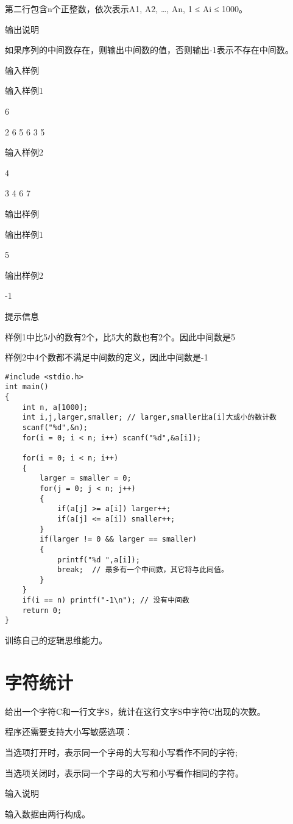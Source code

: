第二行包含n个正整数，依次表示A1, A2, \dots, An, 1 ≤ Ai ≤ 1000。 

输出说明

如果序列的中间数存在，则输出中间数的值，否则输出-1表示不存在中间数。

输入样例

输入样例1 

6 

2 6 5 6 3 5 

输入样例2 

4 

3 4 6 7 

输出样例

输出样例1 

5 

输出样例2 

-1

提示信息

样例1中比5小的数有2个，比5大的数也有2个。因此中间数是5 

样例2中4个数都不满足中间数的定义，因此中间数是-1

\begin{lstlisting}
#include <stdio.h>
int main()
{
	int n, a[1000];
	int i,j,larger,smaller;	// larger,smaller比a[i]大或小的数计数
	scanf("%d",&n);
	for(i = 0; i < n; i++) scanf("%d",&a[i]);
	
	for(i = 0; i < n; i++)
	{
		larger = smaller = 0;
		for(j = 0; j < n; j++)
		{
			if(a[j] >= a[i]) larger++; 
			if(a[j] <= a[i]) smaller++;
		}
		if(larger != 0 && larger == smaller) 
		{
			printf("%d ",a[i]); 
			break;  // 最多有一个中间数，其它将与此同值。 
		}
	}
	if(i == n) printf("-1\n"); // 没有中间数 
	return 0;
}
\end{lstlisting}

\begin{note}[要点]
	训练自己的逻辑思维能力。
\end{note}

\section{字符统计}
给出一个字符C和一行文字S，统计在这行文字S中字符C出现的次数。

程序还需要支持大小写敏感选项：

当选项打开时，表示同一个字母的大写和小写看作不同的字符;

当选项关闭时，表示同一个字母的大写和小写看作相同的字符。

输入说明	

输入数据由两行构成。


